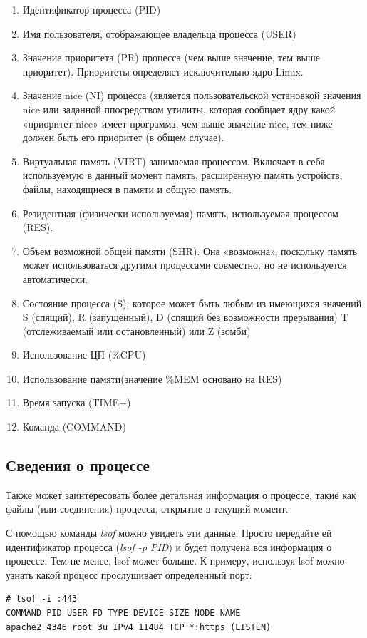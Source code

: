\documentclass[10pt]{book}
\begin{document}
\begin{enumerate}
\item Идентификатор процесса (PID)
\item Имя пользователя, отображающее владельца процесса (USER)
\item Значение приоритета (PR) процесса (чем выше значение, тем выше приоритет). Приоритеты определяет исключительно ядро Linux.
\item Значение nice (NI) процесса (является пользовательской установкой значения nice или заданной ппосредством утилиты, которая сообщает ядру какой «приоритет nice» имеет программа, чем выше значение nice, тем ниже должен быть его приоритет (в общем случае).
\item Виртуальная память (VIRT) занимаемая процессом. Включает в себя используемую в данный момент память, расширенную память устройств, файлы, находящиеся в памяти и общую память.
\item Резидентная (физически используемая) память, используемая процессом (RES).
\item Объем возможной общей памяти (SHR). Она «возможна», поскольку память может использоваться другими процессами совместно, но не используется автоматически.
\item Состояние процесса (S), которое может быть любым из имеющихся значений S (спящий), R (запущенный), D (спящий без возможности прерывания) T (отслеживаемый или остановленный) или Z (зомби)
\item Использование ЦП (\%CPU)
\item Использование памяти(значение \%MEM основано на RES)
\item Время запуска (TIME+)
\item Команда (COMMAND)
\end{enumerate}

\subsection {Сведения о процессе}
Также может заинтересовать более детальная информация о процессе, такие как файлы (или соединения) процесса, открытые в текущий момент.

С помощью команды \textit{lsof} можно увидеть эти данные. Просто передайте ей идентификатор процесса (\textit{lsof -p PID}) и будет получена вся информация о процессе. Тем не менее, lsof может больше. К примеру, используя lsof можно узнать какой процесс прослушивает определенный порт:

\vspace{3mm}
\begin{tcolorbox}
\begin{lstlisting}
# lsof -i :443
COMMAND PID USER FD TYPE DEVICE SIZE NODE NAME
apache2 4346 root 3u IPv4 11484 TCP *:https (LISTEN)
\end{lstlisting}
\end{tcolorbox}
\end{document}
